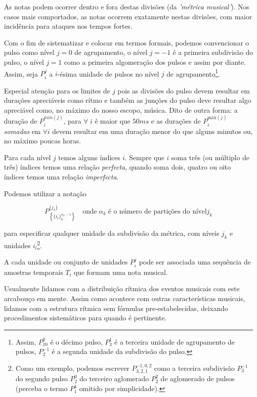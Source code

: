 As notas podem ocorrer dentro e fora destas divisões (da \emph{'métrica musical'}). Nos casos mais comportados, as notas ocorrem exatamente nestas divisões, com maior incidência para ataques nos tempos fortes.

Com o fim de sistematizar e colocar em termos formais, podemos convencionar
o pulso como nível $j=0$ de agrupamento, o nível $j=-1$ 
é a primeira subdivisão do pulso, o nível $j=1$ como a primeira algomeração dos pulsos e assim por diante. 
Assim, seja $P_i^j$ a $i$-ésima unidade de 
pulsos no nível $j$ de agrupamento\footnote{Assim,
$P^0_{10}$ é o décimo pulso, $P^{1}_3$ é a terceira unidade de agrupamento de pulsos,
$P^{-1}_2$ é a segunda unidade da subdivisão do pulso.}.


Especial atenção para
os limites de $j$ pois as divisões do pulso devem resultar em durações apreciáveis
como rítmo e também as junções do pulso deve resultar algo apreciável como, no máximo
do nosso escopo, música. Dito de outra forma: a duração de $P^{min(j)}_i$, para $\forall \; i$
é maior que $50ms$ e as durações de $P^{\text{máx}(j)}_i$ \emph{somadas}  em $\forall i$
devem resultar em uma duração menor do que alguns minutos ou, no máximo poucas horas.


Para cada nível $j$ temos alguns índices $i$. Sempre que $i$ soma três 
(ou múltiplo de três) índices temos uma relação \emph{perfecta}, 
quando soma dois, quatro ou oito índices temos uma relação \emph{imperfecta}.


Podemos utilizar a notação

\begin{equation}
P^{ \{ j_k \} }_{\left \{ \{ i_{l} \}_0^{\alpha_{k}-1} \right \} } \quad \text{onde}\; \alpha_k \; \text{é o número de partições do nível} j_k
\end{equation}

para especificar qualquer unidade da subdivisão da métrica, com níveis $j_k$ e unidades $i_l$\footnote{Como um exemplo, podemos escrever $P^{-1,0,2}_{3,2,1}$  como a terceira subdivisão $P^{-1}_3$ do segundo
pulso $P^0_2$ do terceiro aglomerado $P^2_2$ de aglomerado de pulsos (perceba o termo $P^1_1$ omitido por simplicidade).}.

A cada unidade ou conjunto de unidades $P_i^j$ pode ser associada uma sequência de amostras temporais $T_i$
que formam uma nota musical. 

Usualmente lidamos com a distribuição rítmica dos eventos musicais com este arcabouço em mente. Assim como acontece com outras características
musicais, lidamos com a estrutura rítmica sem fórmulas pre-estabelecidas, deixando procedimentos sistemáticos para quando é pertinente.


